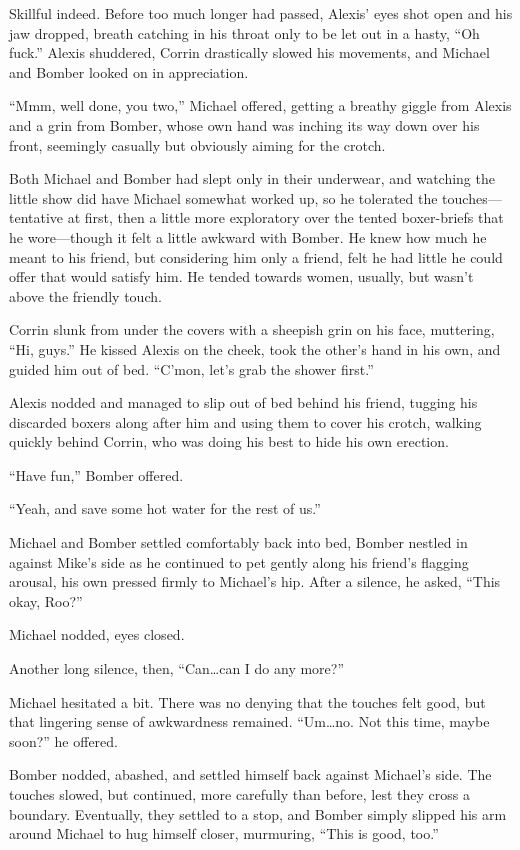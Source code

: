 Skillful indeed. Before too much longer had passed, Alexis' eyes shot open and his jaw dropped, breath catching in his throat only to be let out in a hasty, ``Oh fuck.'' Alexis shuddered, Corrin drastically slowed his movements, and Michael and Bomber looked on in appreciation.

``Mmm, well done, you two,'' Michael offered, getting a breathy giggle from Alexis and a grin from Bomber, whose own hand was inching its way down over his front, seemingly casually but obviously aiming for the crotch.

Both Michael and Bomber had slept only in their underwear, and watching the little show did have Michael somewhat worked up, so he tolerated the touches---tentative at first, then a little more exploratory over the tented boxer-briefs that he wore---though it felt a little awkward with Bomber. He knew how much he meant to his friend, but considering him only a friend, felt he had little he could offer that would satisfy him. He tended towards women, usually, but wasn't above the friendly touch.

Corrin slunk from under the covers with a sheepish grin on his face, muttering, ``Hi, guys.'' He kissed Alexis on the cheek, took the other's hand in his own, and guided him out of bed. ``C'mon, let's grab the shower first.''

Alexis nodded and managed to slip out of bed behind his friend, tugging his discarded boxers along after him and using them to cover his crotch, walking quickly behind Corrin, who was doing his best to hide his own erection.

``Have fun,'' Bomber offered.

``Yeah, and save some hot water for the rest of us.''

Michael and Bomber settled comfortably back into bed, Bomber nestled in against Mike's side as he continued to pet gently along his friend's flagging arousal, his own pressed firmly to Michael's hip. After a silence, he asked, ``This okay, Roo?''

Michael nodded, eyes closed.

Another long silence, then, ``Can\ldots{}can I do any more?''

Michael hesitated a bit. There was no denying that the touches felt good, but that lingering sense of awkwardness remained. ``Um\ldots{}no. Not this time, maybe soon?'' he offered.

Bomber nodded, abashed, and settled himself back against Michael's side. The touches slowed, but continued, more carefully than before, lest they cross a boundary. Eventually, they settled to a stop, and Bomber simply slipped his arm around Michael to hug himself closer, murmuring, ``This is good, too.''

